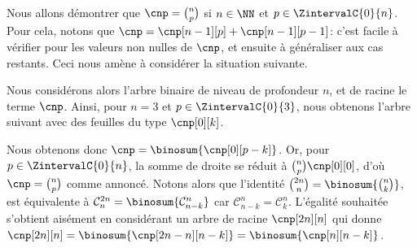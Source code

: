 Nous allons démontrer que $\cnp = \binom{n}{p}$ si $n \in \NN$ et $p \in \ZintervalC{0}{n}$.
%
Pour cela, notons que $\cnp = \cnp[n-1][p] + \cnp[n-1][p-1]$:
c'est facile à vérifier pour les valeurs non nulles de $\cnp$, et ensuite à généraliser aux cas restants.
Ceci nous amène à considérer la situation suivante.

\explaintree{\cnp}{\cnp[n-1][p-1]}{\cnp[n-1][p]}%
            {\factobinomintertree}{}

Nous considérons alors l'arbre binaire de niveau de profondeur $n$, et de racine le terme $\cnp$.
Ainsi, pour $n=3$ et $p \in \ZintervalC{0}{3}$,
nous obtenons l'arbre suivant avec des feuilles du type $\cnp[0][k]$.


Nous obtenons donc
$\cnp = \binosum{\cnp[0][p-k]}$.
Or, pour $p \in \ZintervalC{0}{n}$, la somme de droite se réduit à $\binom{n}{p} \cnp[0][0]$, d'où $\cnp = \binom{n}{p}$ comme annoncé.
%
Notons alors que l'identité
$\binom{2n}{n} = \binosum{\binom{n}{k}}$,
est équivalente à
$\mathcal{C}^{2n}_n = \binosum{\mathcal{C}^n_{n-k}}$ car $\mathcal{C}^n_{n-k} = \mathcal{C}^n_k$.
%
L'égalité souhaitée s'obtient aisément en considérant un arbre de racine $\cnp[2n][n]$ qui donne
$\cnp[2n][n] = \binosum{\cnp[2n - n][n-k]} = \binosum{\cnp[n][n-k]}$.
%
%
%
%
